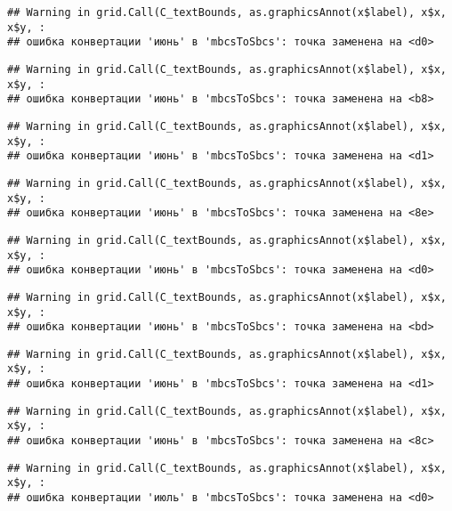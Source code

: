\documentclass[
]{article}
\begin{document}
\begin{verbatim}
## Warning in grid.Call(C_textBounds, as.graphicsAnnot(x$label), x$x, x$y, :
## ошибка конвертации 'июнь' в 'mbcsToSbcs': точка заменена на <d0>
\end{verbatim}

\begin{verbatim}
## Warning in grid.Call(C_textBounds, as.graphicsAnnot(x$label), x$x, x$y, :
## ошибка конвертации 'июнь' в 'mbcsToSbcs': точка заменена на <b8>
\end{verbatim}

\begin{verbatim}
## Warning in grid.Call(C_textBounds, as.graphicsAnnot(x$label), x$x, x$y, :
## ошибка конвертации 'июнь' в 'mbcsToSbcs': точка заменена на <d1>
\end{verbatim}

\begin{verbatim}
## Warning in grid.Call(C_textBounds, as.graphicsAnnot(x$label), x$x, x$y, :
## ошибка конвертации 'июнь' в 'mbcsToSbcs': точка заменена на <8e>
\end{verbatim}

\begin{verbatim}
## Warning in grid.Call(C_textBounds, as.graphicsAnnot(x$label), x$x, x$y, :
## ошибка конвертации 'июнь' в 'mbcsToSbcs': точка заменена на <d0>
\end{verbatim}

\begin{verbatim}
## Warning in grid.Call(C_textBounds, as.graphicsAnnot(x$label), x$x, x$y, :
## ошибка конвертации 'июнь' в 'mbcsToSbcs': точка заменена на <bd>
\end{verbatim}

\begin{verbatim}
## Warning in grid.Call(C_textBounds, as.graphicsAnnot(x$label), x$x, x$y, :
## ошибка конвертации 'июнь' в 'mbcsToSbcs': точка заменена на <d1>
\end{verbatim}

\begin{verbatim}
## Warning in grid.Call(C_textBounds, as.graphicsAnnot(x$label), x$x, x$y, :
## ошибка конвертации 'июнь' в 'mbcsToSbcs': точка заменена на <8c>
\end{verbatim}

\begin{verbatim}
## Warning in grid.Call(C_textBounds, as.graphicsAnnot(x$label), x$x, x$y, :
## ошибка конвертации 'июль' в 'mbcsToSbcs': точка заменена на <d0>
\end{verbatim}
\end{document}
